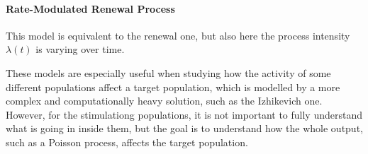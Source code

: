 \paragraph{Rate-Modulated Renewal Process} This model is equivalent to the renewal one, but
also here the process intensity \(\lambda(t)\) is varying over time.\\
\par
These models are especially useful when studying how the activity of some different populations
affect a target population, which is modelled by a more complex and computationally heavy solution,
such as the Izhikevich one. However, for the stimulationg populations, it is not important to fully
understand what is going in inside them, but the goal is to understand how the whole output,
such as a Poisson process, affects the target population.
